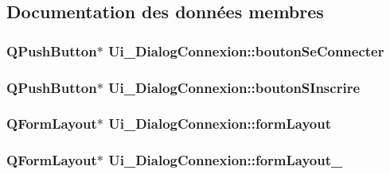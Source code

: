 \subsection{Documentation des données membres}
\hypertarget{class_ui___dialog_connexion_a5c7679d0477929e0d177aa38f9277f62}{
\subsubsection[{bouton\-Se\-Connecter}]{\setlength{\rightskip}{0pt plus 5cm}Q\-Push\-Button$\ast$ Ui\-\_\-\-Dialog\-Connexion\-::bouton\-Se\-Connecter}}\label{class_ui___dialog_connexion_a5c7679d0477929e0d177aa38f9277f62}
\hypertarget{class_ui___dialog_connexion_a11208b09a06acbe25a6c352bdd4c0b3b}{
\subsubsection[{bouton\-S\-Inscrire}]{\setlength{\rightskip}{0pt plus 5cm}Q\-Push\-Button$\ast$ Ui\-\_\-\-Dialog\-Connexion\-::bouton\-S\-Inscrire}}\label{class_ui___dialog_connexion_a11208b09a06acbe25a6c352bdd4c0b3b}
\hypertarget{class_ui___dialog_connexion_aeddc51c77c362a789e75246e03e62713}{
\subsubsection[{form\-Layout}]{\setlength{\rightskip}{0pt plus 5cm}Q\-Form\-Layout$\ast$ Ui\-\_\-\-Dialog\-Connexion\-::form\-Layout}}\label{class_ui___dialog_connexion_aeddc51c77c362a789e75246e03e62713}
\hypertarget{class_ui___dialog_connexion_ad824817e926068b482b4bf73f9632086}{
\subsubsection[{form\-Layout\-\_\-2}]{\setlength{\rightskip}{0pt plus 5cm}Q\-Form\-Layout$\ast$ Ui\-\_\-\-Dialog\-Connexion\-::form\-Layout\-\_}}\label{class_ui___dialog_connexion_ad824817e926068b482b4bf73f9632086}
